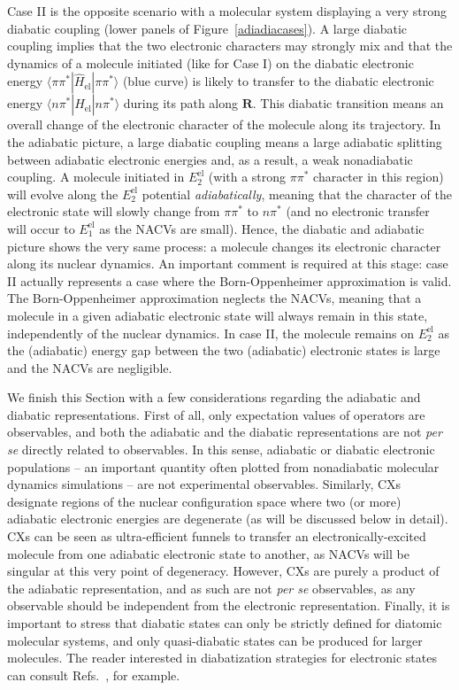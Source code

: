 \documentclass[9pt,bestpractices,pubversion]{livecoms}
\begin{document}
Case II is the opposite scenario with a molecular system displaying a very strong diabatic coupling (lower panels of Figure~\ref{adiadiacases}). A large diabatic coupling implies that the two electronic characters may strongly mix and that the dynamics of a molecule initiated (like for Case I) on the diabatic electronic energy $\langle \pi\pi^\ast | \hat{H}_{\text{el}} | \pi\pi^\ast\rangle$ (blue curve) is likely to transfer to the diabatic electronic energy $\langle n\pi^\ast | \hat{H}_{\text{el}} | n\pi^\ast\rangle$ during its path along $\mathbf{R}$. This diabatic transition means an overall change of the electronic character of the molecule along its trajectory. In the adiabatic picture, a large diabatic coupling means a large adiabatic splitting between adiabatic electronic energies and, as a result, a weak nonadiabatic coupling. A molecule initiated in $E_2^{\text{el}}$ (with a strong $\pi\pi^\ast$ character in this region) will evolve along the $E_2^{\text{el}}$ potential \textit{adiabatically}, meaning that the character of the electronic state will slowly change from $\pi\pi^\ast$ to $n\pi^\ast$ (and no electronic transfer will occur to $E_1^{\text{el}}$ as the NACVs are small). Hence, the diabatic and adiabatic picture shows the very same process: a molecule changes its electronic character along its nuclear dynamics. An important comment is required at this stage: case II actually represents a case where the Born-Oppenheimer approximation is valid. The Born-Oppenheimer approximation neglects the NACVs, meaning that a molecule in a given adiabatic electronic state will always remain in this state, independently of the nuclear dynamics. In case II, the molecule remains on $E_2^{\text{el}}$ as the (adiabatic) energy gap between the two (adiabatic) electronic states is large and the NACVs are negligible. 

We finish this Section with a few considerations regarding the adiabatic and diabatic representations. First of all, only expectation values of operators are observables, and both the adiabatic and the diabatic representations are not \textit{per se} directly related to observables. In this sense, adiabatic or diabatic electronic populations -- an important quantity often plotted from nonadiabatic molecular dynamics simulations -- are not experimental observables. Similarly, CXs designate regions of the nuclear configuration space where two (or more) adiabatic electronic energies are degenerate (as will be discussed below in detail). CXs can be seen as ultra-efficient funnels to transfer an electronically-excited molecule from one adiabatic electronic state to another, as NACVs will be singular at this very point of degeneracy. However, CXs are purely a product of the adiabatic representation, and as such are not \textit{per se} observables, as any observable should be independent from the electronic representation. Finally, it is important to stress that diabatic states can only be strictly defined for diatomic molecular systems, and only quasi-diabatic states can be produced for larger molecules.\cite{mead1982conditions} The reader interested in diabatization strategies for electronic states can consult Refs.~\cite{conicalintersection2004,Wittenbrink2016diab}, for example.
\end{document}
